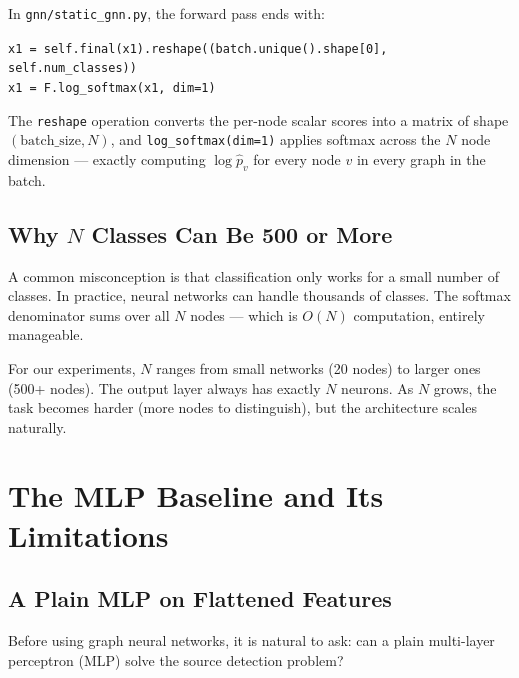 In \texttt{gnn/static\_gnn.py}, the forward pass ends with:
\begin{center}
\texttt{x1 = self.final(x1).reshape((batch.unique().shape[0], self.num\_classes))}\\
\texttt{x1 = F.log\_softmax(x1, dim=1)}
\end{center}
The \texttt{reshape} operation converts the per-node scalar scores into a matrix of shape $(\text{batch\_size}, N)$, and \texttt{log\_softmax(dim=1)} applies softmax across the $N$ node dimension --- exactly computing $\log \hat{p}_v$ for every node $v$ in every graph in the batch.

\subsection{Why $N$ Classes Can Be 500 or More}

A common misconception is that classification only works for a small number of classes. In practice, neural networks can handle thousands of classes. The softmax denominator sums over all $N$ nodes --- which is $O(N)$ computation, entirely manageable.

For our experiments, $N$ ranges from small networks (20 nodes) to larger ones (500+ nodes). The output layer always has exactly $N$ neurons. As $N$ grows, the task becomes harder (more nodes to distinguish), but the architecture scales naturally.

\section{The MLP Baseline and Its Limitations}
\label{sec:mlp_baseline}

\subsection{A Plain MLP on Flattened Features}

Before using graph neural networks, it is natural to ask: can a plain multi-layer perceptron (MLP) solve the source detection problem?

